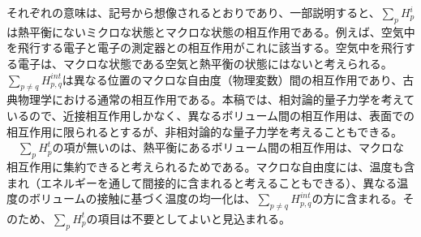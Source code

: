 それぞれの意味は、記号から想像されるとおりであり、一部説明すると、$\sum_p H_p^i$は熱平衡にないミクロな状態とマクロな状態の相互作用である。例えば、空気中を飛行する電子と電子の測定器との相互作用がこれに該当する。空気中を飛行する電子は、マクロな状態である空気と熱平衡の状態にはないと考えられる。$\sum_{p \neq q} H^{int}_{p,q}$は異なる位置のマクロな自由度（物理変数）間の相互作用であり、古典物理学における通常の相互作用である。本稿では、相対論的量子力学を考えているので、近接相互作用しかなく、異なるボリューム間の相互作用は、表面での相互作用に限られるとするが、非相対論的な量子力学を考えることもできる。\\
　$\sum_p H_p^t$の項が無いのは、熱平衡にあるボリューム間の相互作用は、マクロな相互作用に集約できると考えられるためである。マクロな自由度には、温度も含まれ（エネルギーを通して間接的に含まれると考えることもできる）、異なる温度のボリュームの接触に基づく温度の均一化は、$\sum_{p \neq q} H^{int}_{p,q}$の方に含まれる。そのため、$\sum_p H_p^t$の項目は不要としてよいと見込まれる。